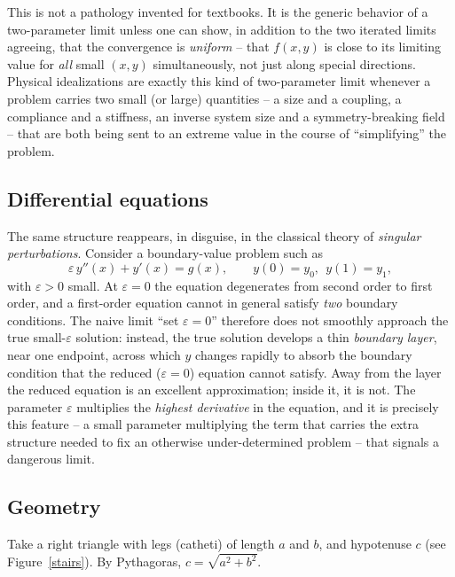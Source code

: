 This is not a pathology invented for textbooks. It is the
generic behavior of a two-parameter limit unless one can show,
in addition to the two iterated limits agreeing, that the
convergence is \emph{uniform} -- that $f(x,y)$ is close to its
limiting value for \emph{all} small $(x,y)$ simultaneously, not
just along special directions. Physical idealizations are
exactly this kind of two-parameter limit whenever a problem
carries two small (or large) quantities -- a size and a
coupling, a compliance and a stiffness, an inverse system size
and a symmetry-breaking field -- that are both being sent to an
extreme value in the course of ``simplifying'' the problem.

\subsection{Differential equations}

The same structure reappears, in disguise, in the classical
theory of \emph{singular perturbations}. Consider a
boundary-value problem such as
\begin{equation}
\varepsilon\, y''(x) + y'(x) = g(x), \qquad y(0)=y_0,\ \ y(1)=y_1,
\end{equation}
with $\varepsilon>0$ small. At $\varepsilon=0$ the equation
degenerates from second order to first order, and a first-order
equation cannot in general satisfy \emph{two} boundary
conditions. The naive limit ``set $\varepsilon=0$'' therefore
does not smoothly approach the true small-$\varepsilon$
solution: instead, the true solution develops a thin
\emph{boundary layer}, near one endpoint, across which $y$
changes rapidly to absorb the boundary condition that the
reduced ($\varepsilon=0$) equation cannot satisfy. Away from the
layer the reduced equation is an excellent approximation; inside
it, it is not. The parameter $\varepsilon$ multiplies the
\emph{highest derivative} in the equation, and it is precisely
this feature -- a small parameter multiplying the term that
carries the extra structure needed to fix an otherwise
under-determined problem -- that signals a dangerous limit. 

\subsection{Geometry}

Take a right triangle with legs (catheti) of length $a$ and $b$, and hypotenuse
$c$ (see  Figure~\ref{stairs}). 
By Pythagoras,
$c=\sqrt{a^2+b^2}$. 

